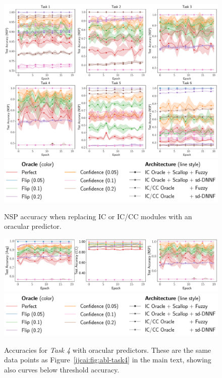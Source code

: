 \begin{figure}
	\centering
	\includegraphics[width=\linewidth]{imgs/ijcai/ablation_successor_full.pdf}
	\includegraphics[width=\linewidth]{imgs/ijcai/ablation_task4_legend.pdf}
	\caption{\textsc{NSP} accuracy when replacing \textsc{IC} or \textsc{IC/CC} modules with an oracular predictor.}
	\label{ijcai:fig:abl-succ}
\end{figure}

\begin{figure}
	\centering
	\includegraphics[width=\linewidth]{imgs/ijcai/ablation_task4_full.pdf}
	\includegraphics[width=\linewidth]{imgs/ijcai/ablation_task4_legend.pdf}
	\caption{Accuracies for \textit{Task 4} with oracular predictors. These are the same data points as Figure~\ref{ijcai:fig:abl-task4} in the main text, showing also curves below threshold accuracy.}
	\label{ijcai:fig:abl-task4-nolimits}
\end{figure}